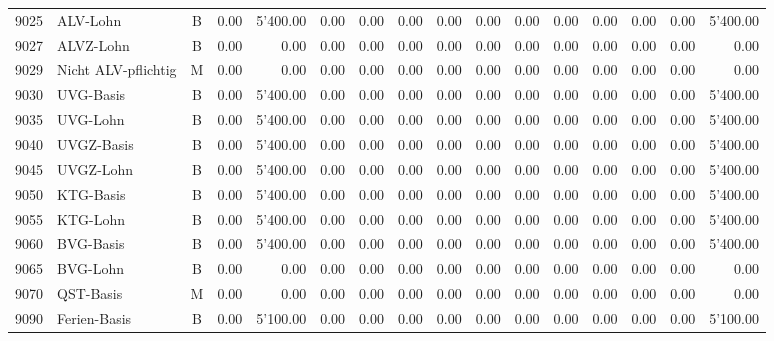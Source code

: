 \documentclass[8pt,a4paper]{extarticle}
\begin{document}
\begin{longtable}{@{\extracolsep{\fill}} l l c r r r r r r r r r r r r r}
9025&ALV-Lohn&B&0.00&5'400.00&0.00&0.00&0.00&0.00&0.00&0.00&0.00&0.00&0.00&0.00&5'400.00\\
9027&ALVZ-Lohn&B&0.00&0.00&0.00&0.00&0.00&0.00&0.00&0.00&0.00&0.00&0.00&0.00&0.00\\
9029&Nicht ALV-pflichtig&M&0.00&0.00&0.00&0.00&0.00&0.00&0.00&0.00&0.00&0.00&0.00&0.00&0.00\\
9030&UVG-Basis&B&0.00&5'400.00&0.00&0.00&0.00&0.00&0.00&0.00&0.00&0.00&0.00&0.00&5'400.00\\
9035&UVG-Lohn&B&0.00&5'400.00&0.00&0.00&0.00&0.00&0.00&0.00&0.00&0.00&0.00&0.00&5'400.00\\
9040&UVGZ-Basis&B&0.00&5'400.00&0.00&0.00&0.00&0.00&0.00&0.00&0.00&0.00&0.00&0.00&5'400.00\\
9045&UVGZ-Lohn&B&0.00&5'400.00&0.00&0.00&0.00&0.00&0.00&0.00&0.00&0.00&0.00&0.00&5'400.00\\
9050&KTG-Basis&B&0.00&5'400.00&0.00&0.00&0.00&0.00&0.00&0.00&0.00&0.00&0.00&0.00&5'400.00\\
9055&KTG-Lohn&B&0.00&5'400.00&0.00&0.00&0.00&0.00&0.00&0.00&0.00&0.00&0.00&0.00&5'400.00\\
9060&BVG-Basis&B&0.00&5'400.00&0.00&0.00&0.00&0.00&0.00&0.00&0.00&0.00&0.00&0.00&5'400.00\\
9065&BVG-Lohn&B&0.00&0.00&0.00&0.00&0.00&0.00&0.00&0.00&0.00&0.00&0.00&0.00&0.00\\
9070&QST-Basis&M&0.00&0.00&0.00&0.00&0.00&0.00&0.00&0.00&0.00&0.00&0.00&0.00&0.00\\
9090&Ferien-Basis&B&0.00&5'100.00&0.00&0.00&0.00&0.00&0.00&0.00&0.00&0.00&0.00&0.00&5'100.00\\

\end{longtable}
\pagebreak
\end{document}
